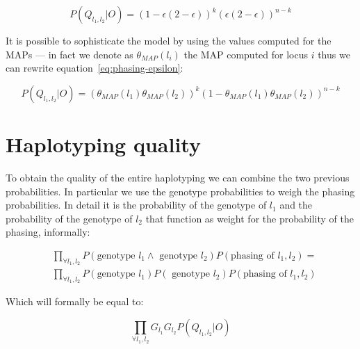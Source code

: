 \documentclass{article}
\begin{document}
\begin{equation}
  P(Q_{l_1,l_2}|O) = (1 - \epsilon(2-\epsilon))^k 
  (\epsilon(2-\epsilon))^{n-k}
  \label{eq:phasing-epsilon}
\end{equation}

It is possible to sophisticate the model by using the values computed
for the MAPs --- in fact we denote as $\theta_{MAP}(l_i)$ the MAP
computed for locus $i$ thus we can rewrite
equation~\ref{eq:phasing-epsilon}:

\begin{equation}
  P(Q_{l_1,l_2}|O) = (\theta_{MAP}(l_1)\theta_{MAP}(l_2))^k
  (1- \theta_{MAP}(l_1)\theta_{MAP}(l_2))^{n-k}
\end{equation}

\section{Haplotyping quality}

To obtain the quality of the entire haplotyping we can combine the two
previous probabilities.  In particular we use the genotype
probabilities to weigh the phasing probabilities.  In detail it is the
probability of the genotype of $l_1$ and the probability of the
genotype of $l_2$ that function as weight for the probability of the
phasing, informally:

\begin{equation*}
  \begin{split}
    &\prod_{\forall l_1, l_2} P(\mbox{genotype } l_1 \wedge \mbox{ genotype } l_2) 
    P(\mbox{phasing of } l_1, l_2) = \\
    &\prod_{\forall l_1, l_2} P(\mbox{genotype } l_1) P(\mbox{ genotype } l_2) 
    P(\mbox{phasing of } l_1, l_2)
  \end{split}
\end{equation*}

Which will formally be equal to:

\begin{equation}
  \prod_{\forall l_1, l_2} G_{l_1} G_{l_2} P(Q_{l_1,l_2}|O)
\end{equation}
\end{document}
